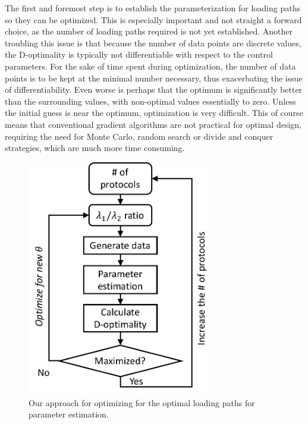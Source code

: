    
    The first and foremost step is to establish the parameterization for loading paths so they can be optimized. This is especially important and not straight a forward choice, as the number of loading paths required is not yet established. Another troubling this issue is that because the number of data points are discrete values, the D-optimality is typically not differentiable with respect to the control parameters. For the sake of time spent during optimization, the number of data points is to be kept at the minimal number necessary, thus exacerbating the issue of differentiability. Even worse is perhaps that the optimum is significantly better than the surrounding values, with non-optimal values essentially to zero. Unless the initial guess is near the optimum, optimization is very difficult. This of course means that conventional gradient algorithms are not practical for optimal design, requiring the need for Monte Carlo, random search or divide and conquer strategies, which are much more time consuming. 
    

\begin{figure}
\centering
\includegraphics[width=3.25in]{Figures/optimaldesign}
\caption{Our approach for optimizing for the optimal loading paths for parameter estimation.}
\label{fig:optimaldesign}
\end{figure}

